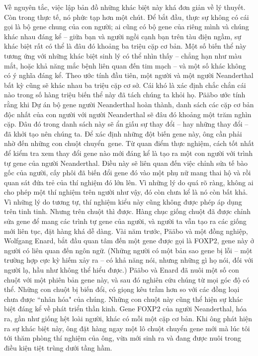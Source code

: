 \begin{multicols}{2}
	Về nguyên tắc, việc lập bản đồ những khác biệt này khá đơn giản về lý thuyết. Còn trong thực tế, nó phức tạp hơn một chút. Để bắt đầu, thực sự không có cái gọi là bộ gene chung của con người; ai cũng có bộ gene của riêng mình và chúng khác nhau đáng kể -- giữa bạn và người ngồi cạnh bạn trên tàu điện ngầm, sự khác biệt rất có thể là đâu đó khoảng ba triệu cặp cơ bản. Một số biến thể này tương ứng với những khác biệt sinh lý có thể nhìn thấy -- chẳng hạn như màu mắt, hoặc khả năng mắc bệnh liên quan đến tim mạch -- và một số khác không có ý nghĩa đáng kể. Theo ước tính đầu tiên, một người và một người Neanderthal bất kỳ cũng sẽ khác nhau ba triệu cặp cơ sở. Cái khó là xác định chắc chắn cái nào trong số hàng triệu biến thể này đã tách chúng ta khỏi họ. Pääbo ước tính rằng khi Dự án bộ gene người Neanderthal hoàn thành, danh sách các cặp cơ bản độc nhất của con người với người Neanderthal sẽ đâu đó khoảng một trăm nghìn cặp. Đâu đó trong danh sách này sẽ ẩn giấu sự thay đổi -- hay những thay đổi -- đã khởi tạo nên chúng ta. Để xác định những đột biến gene này, ông cần phải nhờ đến những con chuột chuyển~gene.
	\vskip 0.1cm
	Từ quan điểm thực nghiệm, cách tốt nhất để kiểm tra xem thay đổi gene nào mới đáng kể là tạo ra một con người với trình tự gene của người Neanderthal. Điều này sẽ liên quan đến việc chỉnh sửa tế bào gốc của người, cấy phôi đã biến đổi gene đó vào một phụ nữ mang thai hộ và rồi quan sát đứa trẻ của thí nghiệm đó lớn lên. Vì những lý do quá rõ ràng, không ai cho phép một thí nghiệm trên người như vậy, đó còn chưa kể là nó còn bất khả. Vì những lý do tương tự, thí nghiệm kiểu này cũng không được phép áp dụng trên tinh tinh. Nhưng trên chuột thì được. Hàng chục giống chuột đã được chỉnh sửa gene để mang các trình tự gene của người, và người ta vẫn tạo ra các giống mới liên tục, đặt hàng khá dễ dàng.
	\vskip 0.1cm
	Vài năm trước, Pääbo và một đồng nghiệp, Wolfgang Enard, bắt đầu quan tâm đến một gene được gọi là FOXP$2$, gene này ở người có liên quan đến ngôn ngữ. (Những người có một bản sao gene bị lỗi -- một trường hợp cực kỳ hiếm xảy ra -- có khả năng nói, nhưng những gì họ nói, đối với người lạ, hầu như không thể hiểu được.) Pääbo và Enard đã nuôi một số con chuột với một phiên bản gene này, và sau đó nghiên cứu chúng từ mọi góc độ có thể. Những con chuột bị biến đổi, có giọng kêu trầm hơn so với các đồng loại chưa được ``nhân hóa" của chúng. Những con chuột này cũng thể hiện sự khác biệt đáng kể về phát triển thần kinh. Gene FOXP$2$ của người Neanderthal, hóa ra, gần như giống hệt loài người, khác có mỗi một cặp cơ bản. Khi ông phát hiện ra sự khác biệt này, ông đặt hàng ngay một lô chuột chuyển gene mới mà lúc tôi tới thăm phòng thí nghiệm của ông, vừa mới sinh ra và đang được nuôi trong điều kiện tiệt trùng dưới tầng hầm.

\end{multicols}
